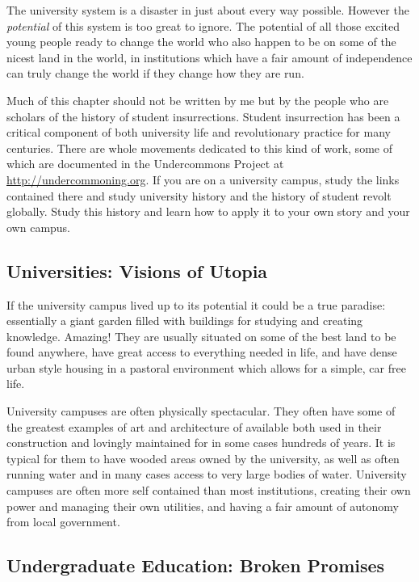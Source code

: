 The university system is a disaster in just about every way possible.
However the \emph{potential} of this system is too great to ignore. The
potential of all those excited young people ready to change the world
who also happen to be on some of the nicest land in the world, in
institutions which have a fair amount of independence can truly change
the world if they change how they are run.

Much of this chapter should not be written by me but by the people who
are scholars of the history of student insurrections. Student
insurrection has been a critical component of both university life and
revolutionary practice for many centuries. There are whole movements
dedicated to this kind of work, some of which are documented in the
Undercommons Project at \url{http://undercommoning.org}. If you are on a
university campus, study the links contained there and study university
history and the history of student revolt globally. Study this history
and learn how to apply it to your own story and your own campus.

\subsection{Universities: Visions of
Utopia}\label{universities-visions-of-utopia}

If the university campus lived up to its potential it could be a true
paradise: essentially a giant garden filled with buildings for studying
and creating knowledge. Amazing! They are usually situated on some of
the best land to be found anywhere, have great access to everything
needed in life, and have dense urban style housing in a pastoral
environment which allows for a simple, car free life.

University campuses are often physically spectacular. They often have
some of the greatest examples of art and architecture of available both
used in their construction and lovingly maintained for in some cases
hundreds of years. It is typical for them to have wooded areas owned by
the university, as well as often running water and in many cases access
to very large bodies of water. University campuses are often more self
contained than most institutions, creating their own power and managing
their own utilities, and having a fair amount of autonomy from local
government.

\subsection{Undergraduate Education: Broken
Promises}\label{undergraduate-education-broken-promises}

